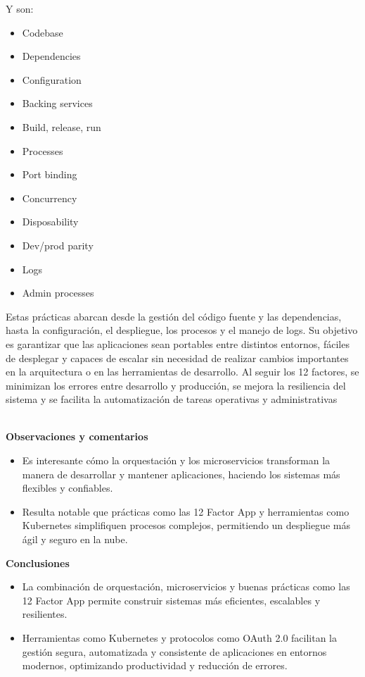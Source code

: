 \documentclass[12pt]{article}
\begin{document}
Y son:
\begin{itemize}
    \item Codebase
    \item Dependencies
    \item Configuration
    \item Backing services
    \item Build, release, run
    \item Processes
    \item Port binding
    \item Concurrency
    \item Disposability
    \item Dev/prod parity
    \item Logs
    \item Admin processes
\end{itemize}
Estas prácticas abarcan desde la gestión del código fuente y las dependencias, hasta la configuración, el despliegue, los procesos y el manejo de logs. Su objetivo es garantizar que las aplicaciones sean portables entre distintos entornos, fáciles de desplegar y capaces de escalar sin necesidad de realizar cambios importantes en la arquitectura o en las herramientas de desarrollo. Al seguir los 12 factores, se minimizan los errores entre desarrollo y producción, se mejora la resiliencia del sistema y se facilita la automatización de tareas operativas y administrativas

 \\


\noindent\textbf{Observaciones y comentarios} 
\begin{itemize}
    \item{Es interesante cómo la orquestación y los microservicios transforman la manera de desarrollar y mantener aplicaciones, haciendo los sistemas más flexibles y confiables.}
    \item{Resulta notable que prácticas como las 12 Factor App y herramientas como Kubernetes simplifiquen procesos complejos, permitiendo un despliegue más ágil y seguro en la nube.}
\end{itemize}

\noindent\textbf{Conclusiones} 
\begin{itemize}
    \item{La combinación de orquestación, microservicios y buenas prácticas como las 12 Factor App permite construir sistemas más eficientes, escalables y resilientes.}
    \item {Herramientas como Kubernetes y protocolos como OAuth 2.0 facilitan la gestión segura, automatizada y consistente de aplicaciones en entornos modernos, optimizando productividad y reducción de errores.}
\end{itemize}
\end{document}
